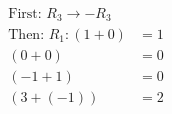 \documentclass[preview]{standalone}
\begin{document}
\begin{align*}
\text{First: } R_3 \rightarrow -R_3 \\ \text{Then: } R_1: (1 + 0) & = 1 \\ (0 + 0) & = 0 \\ (-1 + 1) & = 0 \\ (3 + (-1)) & = 2
\end{align*}
\end{document}
